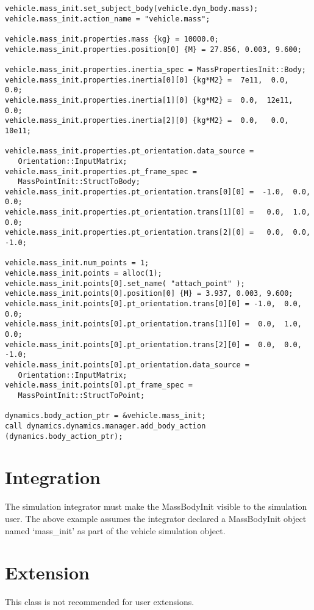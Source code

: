 \begin{verbatim}
vehicle.mass_init.set_subject_body(vehicle.dyn_body.mass);
vehicle.mass_init.action_name = "vehicle.mass";

vehicle.mass_init.properties.mass {kg} = 10000.0;
vehicle.mass_init.properties.position[0] {M} = 27.856, 0.003, 9.600;

vehicle.mass_init.properties.inertia_spec = MassPropertiesInit::Body;
vehicle.mass_init.properties.inertia[0][0] {kg*M2} =  7e11,  0.0,   0.0;
vehicle.mass_init.properties.inertia[1][0] {kg*M2} =  0.0,  12e11,  0.0;
vehicle.mass_init.properties.inertia[2][0] {kg*M2} =  0.0,   0.0,  10e11;

vehicle.mass_init.properties.pt_orientation.data_source =
   Orientation::InputMatrix;
vehicle.mass_init.properties.pt_frame_spec =
   MassPointInit::StructToBody;
vehicle.mass_init.properties.pt_orientation.trans[0][0] =  -1.0,  0.0,  0.0;
vehicle.mass_init.properties.pt_orientation.trans[1][0] =   0.0,  1.0,  0.0;
vehicle.mass_init.properties.pt_orientation.trans[2][0] =   0.0,  0.0, -1.0;

vehicle.mass_init.num_points = 1;
vehicle.mass_init.points = alloc(1);
vehicle.mass_init.points[0].set_name( "attach_point" );
vehicle.mass_init.points[0].position[0] {M} = 3.937, 0.003, 9.600;
vehicle.mass_init.points[0].pt_orientation.trans[0][0] = -1.0,  0.0,  0.0;
vehicle.mass_init.points[0].pt_orientation.trans[1][0] =  0.0,  1.0,  0.0;
vehicle.mass_init.points[0].pt_orientation.trans[2][0] =  0.0,  0.0, -1.0;
vehicle.mass_init.points[0].pt_orientation.data_source =
   Orientation::InputMatrix;
vehicle.mass_init.points[0].pt_frame_spec =
   MassPointInit::StructToPoint;

dynamics.body_action_ptr = &vehicle.mass_init;
call dynamics.dynamics.manager.add_body_action (dynamics.body_action_ptr);
\end{verbatim}


\section{Integration}
The simulation integrator must make the MassBodyInit visible to
the simulation user. The above example assumes the integrator declared
a MassBodyInit object named `mass\_init' as part of the vehicle
simulation object.

\section{Extension}
This class is not recommended for user extensions.

